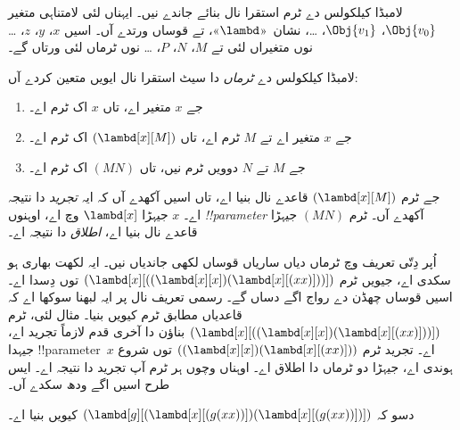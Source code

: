 \documentclass[../../../include/open-logic-section]{subfiles}
\begin{document}

لامبڈا کیلکولس دے ٹرم استقرا نال بنائے جاندے نیں۔ ایہناں لئی
لامتناہی متغیر $\Obj{v_0}$، $\Obj{v_1}$، \dots، نشان~«$\lambd$»،
تے قوساں ورتدے آں۔ اسیں $x$، $y$، $z$، \dots{} نوں متغیراں
لئی تے $M$، $N$، $P$، \dots{} نوں ٹرماں لئی ورتاں گے۔

\begin{defn}[ٹرم] 
لامبڈا کیلکولس دے \emph{ٹرماں} دا سیٹ استقرا نال ایویں متعین کردے آں:
\begin{enumerate}
  \item {} جے $x$ متغیر اے، تاں $x$ اک ٹرم اے۔
  \item {} جے $x$ متغیر اے تے $M$ ٹرم اے،
    تاں $(\lambd[x][M])$ اک ٹرم اے۔
  \item {} جے $M$ تے $N$ دوویں ٹرم نیں،
    تاں $(MN)$ اک ٹرم اے۔
\end{enumerate}
\end{defn}

جے ٹرم $(\lambd[x][M])$ قاعدے  نال
بنیا اے، تاں اسیں آکھدے آں کہ ایہ \emph{تجرید} دا نتیجہ اے۔
$x$ جیہڑا $\lambd[x]$ وچ اے، اوہنوں \emph{!!{parameter}} آکھدے آں۔
ٹرم $(MN)$ جیہڑا قاعدے  نال بنیا اے،
\emph{اطلاق} دا نتیجہ اے۔

اُپر دِتّی تعریف وچ ٹرماں دیاں ساریاں قوساں لکھی جاندیاں نیں۔
ایہ لکھت بھاری ہو سکدی اے، جیویں ٹرم
$(\lambd[x][((\lambd[x][x])(\lambd[x][(xx)]))])$ توں دِسدا اے۔
اسیں قوساں چھڈن دے رواج اگے دساں گے۔ رسمی تعریف نال پر ایہ
لبھنا سوکھا اے کہ قاعدیاں  مطابق ٹرم کیویں بنیا۔
مثال لئی، ٹرم $(\lambd[x][((\lambd[x][x])(\lambd[x][(xx)]))])$
بناؤن دا آخری قدم لازماً تجرید اے، جیہدا !!{parameter}~$x$ اے۔
تجرید ٹرم $((\lambd[x][x])(\lambd[x][(xx)]))$ توں شروع ہوندی اے،
جیہڑا دو ٹرماں دا اطلاق اے۔ اوہناں وچوں ہر ٹرم آپ تجرید دا
نتیجہ اے۔ ایس طرح اسیں اگے ودھ سکدے آں۔

\begin{prob}
دسو کہ $(\lambd[g][(\lambd[x][(g (x x))])
  (\lambd[x][(g (x x))])])$ کیویں بنیا اے۔
\end{prob}
\end{document}
